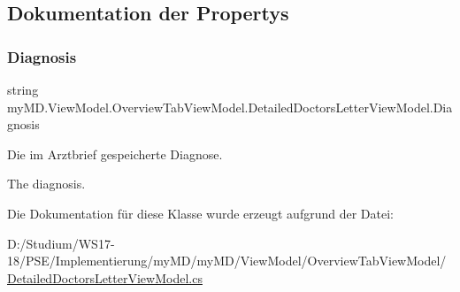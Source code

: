 \subsection{Dokumentation der Propertys}
\mbox{\label{classmy_m_d_1_1_view_model_1_1_overview_tab_view_model_1_1_detailed_doctors_letter_view_model_a8a19eda5700386266c53ed6fb1f22a9c}} 
\subsubsection{\texorpdfstring{Diagnosis}{Diagnosis}}
{\footnotesize\ttfamily string my\+M\+D.\+View\+Model.\+Overview\+Tab\+View\+Model.\+Detailed\+Doctors\+Letter\+View\+Model.\+Diagnosis\hspace{0.3cm}{\ttfamily [get]}}



Die im Arztbrief gespeicherte Diagnose. 

The diagnosis.

Die Dokumentation für diese Klasse wurde erzeugt aufgrund der Datei\+:\begin{DoxyCompactItemize}
\item 
D\+:/\+Studium/\+W\+S17-\/18/\+P\+S\+E/\+Implementierung/my\+M\+D/my\+M\+D/\+View\+Model/\+Overview\+Tab\+View\+Model/\mbox{\hyperlink{_detailed_doctors_letter_view_model_8cs}{Detailed\+Doctors\+Letter\+View\+Model.\+cs}}\end{DoxyCompactItemize}
